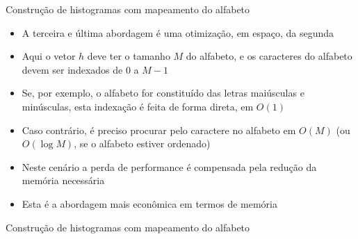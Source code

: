 \begin{frame}[fragile]{Construção de histogramas com mapeamento do alfabeto}

    \begin{itemize}
        \item A terceira e última abordagem é uma otimização, em espaço, da segunda

        \item Aqui o vetor $h$ deve ter o tamanho $M$ do alfabeto, e os caracteres do alfabeto 
            devem ser indexados de 0 a $M - 1$

        \item Se, por exemplo, o alfabeto for constituído das letras maiúsculas e minúsculas, 
            esta indexação é feita de forma direta, em $O(1)$

        \item Caso contrário, é preciso procurar pelo caractere no alfabeto em $O(M)$ (ou 
            $O(\log M)$, se o alfabeto estiver ordenado)

        \item Neste cenário a perda de performance é compensada pela redução da memória necessária 

        \item Esta é a abordagem mais econômica em termos de memória

    \end{itemize}

\end{frame}

\begin{frame}[fragile]{Construção de histogramas com mapeamento do alfabeto}
\end{frame}
